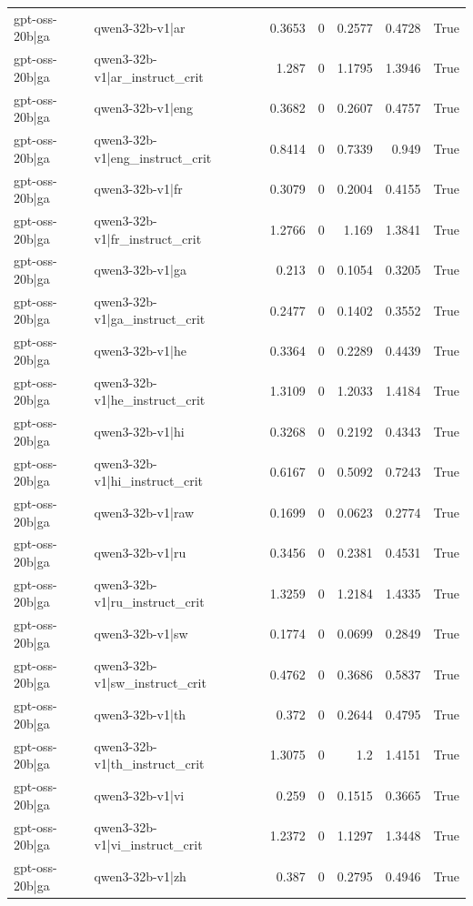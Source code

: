 \begin{table}
\begin{tabular}{l l r r r r l}
gpt-oss-20b|ga & qwen3-32b-v1|ar & 0.3653 & 0 & 0.2577 & 0.4728 & True \\
gpt-oss-20b|ga & qwen3-32b-v1|ar_instruct_crit & 1.287 & 0 & 1.1795 & 1.3946 & True \\
gpt-oss-20b|ga & qwen3-32b-v1|eng & 0.3682 & 0 & 0.2607 & 0.4757 & True \\
gpt-oss-20b|ga & qwen3-32b-v1|eng_instruct_crit & 0.8414 & 0 & 0.7339 & 0.949 & True \\
gpt-oss-20b|ga & qwen3-32b-v1|fr & 0.3079 & 0 & 0.2004 & 0.4155 & True \\
gpt-oss-20b|ga & qwen3-32b-v1|fr_instruct_crit & 1.2766 & 0 & 1.169 & 1.3841 & True \\
gpt-oss-20b|ga & qwen3-32b-v1|ga & 0.213 & 0 & 0.1054 & 0.3205 & True \\
gpt-oss-20b|ga & qwen3-32b-v1|ga_instruct_crit & 0.2477 & 0 & 0.1402 & 0.3552 & True \\
gpt-oss-20b|ga & qwen3-32b-v1|he & 0.3364 & 0 & 0.2289 & 0.4439 & True \\
gpt-oss-20b|ga & qwen3-32b-v1|he_instruct_crit & 1.3109 & 0 & 1.2033 & 1.4184 & True \\
gpt-oss-20b|ga & qwen3-32b-v1|hi & 0.3268 & 0 & 0.2192 & 0.4343 & True \\
gpt-oss-20b|ga & qwen3-32b-v1|hi_instruct_crit & 0.6167 & 0 & 0.5092 & 0.7243 & True \\
gpt-oss-20b|ga & qwen3-32b-v1|raw & 0.1699 & 0 & 0.0623 & 0.2774 & True \\
gpt-oss-20b|ga & qwen3-32b-v1|ru & 0.3456 & 0 & 0.2381 & 0.4531 & True \\
gpt-oss-20b|ga & qwen3-32b-v1|ru_instruct_crit & 1.3259 & 0 & 1.2184 & 1.4335 & True \\
gpt-oss-20b|ga & qwen3-32b-v1|sw & 0.1774 & 0 & 0.0699 & 0.2849 & True \\
gpt-oss-20b|ga & qwen3-32b-v1|sw_instruct_crit & 0.4762 & 0 & 0.3686 & 0.5837 & True \\
gpt-oss-20b|ga & qwen3-32b-v1|th & 0.372 & 0 & 0.2644 & 0.4795 & True \\
gpt-oss-20b|ga & qwen3-32b-v1|th_instruct_crit & 1.3075 & 0 & 1.2 & 1.4151 & True \\
gpt-oss-20b|ga & qwen3-32b-v1|vi & 0.259 & 0 & 0.1515 & 0.3665 & True \\
gpt-oss-20b|ga & qwen3-32b-v1|vi_instruct_crit & 1.2372 & 0 & 1.1297 & 1.3448 & True \\
gpt-oss-20b|ga & qwen3-32b-v1|zh & 0.387 & 0 & 0.2795 & 0.4946 & True \\

\end{tabular}
\end{table}
